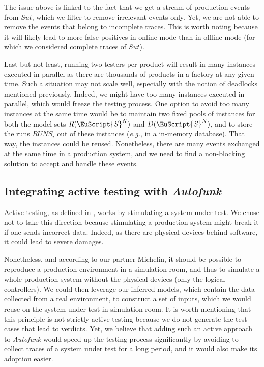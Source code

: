 The issue above is linked to the fact that we get a stream of
production events from $\mathit{Sut}$, which we filter to remove
irrelevant events only. Yet, we are not able to remove the events
that belong to incomplete traces. This is worth noting because it
will likely lead to more false positives in online mode than in
offline mode (for which we considered complete traces of
$\mathit{Sut}$).

Last but not least, running two testers per product will result
in many instances executed in parallel as there are thousands of
products in a factory at any given time. Such a situation may not
scale well, especially with the notion of deadlocks mentioned
previously. Indeed, we might have too many instances executed in
parallel, which would freeze the testing process. One option to
avoid too many instances at the same time would be to maintain
two fixed pools of instances for both the model sets
$R(\EuScript{S}^N)$ and $D(\EuScript{S}^N)$, and to store the
runs $RUNS_i$ out of these instances (\emph{e.g.}, in a in-memory
database). That way, the instances could be reused. Nonetheless,
there are many events exchanged at the same time in a production
system, and we need to find a non-blocking solution to accept and
handle these events.


\subsection{Integrating active testing with \emph{Autofunk}}
\label{sec:conclusion:testing:active}

Active testing, as defined in
,
works by stimulating a system under test. We chose not to take
this direction because stimulating a production system might
break it if one sends incorrect data. Indeed, as there are
physical devices behind software, it could lead to severe
damages.

Nonetheless, and according to our partner Michelin, it
should be possible to reproduce a production environment in a
simulation room, and thus to simulate a whole production system
without the physical devices (only the logical controllers). We
could then leverage our inferred models, which contain the data
collected from a real environment, to construct a set of inputs,
which we would reuse on the system under test in simulation room.
It is worth mentioning that this principle is not strictly active
testing because we do not generate the test cases that lead to
verdicts.  Yet, we believe that adding such an active approach to
\textit{Autofunk} would speed up the testing process
significantly by avoiding to collect traces of a system under
test for a long period, and it would also make its adoption
easier.

